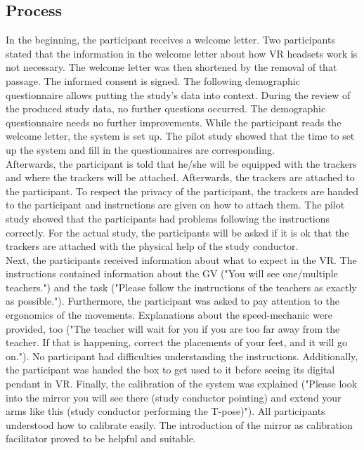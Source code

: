 \subsection{Process}
In the beginning, the participant receives a welcome letter. Two participants stated that the information in the welcome letter about how VR headsets work is not necessary. The welcome letter was then shortened by the removal of that passage. The informed consent is signed. The following demographic questionnaire allows putting the study's data into context. During the review of the produced study data, no further questions occurred. The demographic questionnaire needs no further improvements. While the participant reads the welcome letter, the system is set up. The pilot study showed that the time to set up the system and fill in the questionnaires are corresponding.\\
Afterwards, the participant is told that he/she will be equipped with the trackers and where the trackers will be attached. Afterwards, the trackers are attached to the participant. To respect the privacy of the participant, the trackers are handed to the participant and instructions are given on how to attach them. The pilot study showed that the participants had problems following the instructions correctly. For the actual study, the participants will be asked if it is ok that the trackers are attached with the physical help of the study conductor.\\
Next, the participants received information about what to expect in the VR. The instructions contained information about the GV ("You will see one/multiple teachers.") and the task ("Please follow the instructions of the teachers as exactly as possible."). Furthermore, the participant was asked to pay attention to the ergonomics of the movements. Explanations about the speed-mechanic were provided, too ("The teacher will wait for you if you are too far away from the teacher. If that is happening, correct the placements of your feet, and it will go on."). No participant had difficulties understanding the instructions. Additionally, the participant was handed the box to get used to it before seeing its digital pendant in VR. Finally, the calibration of the system was explained ("Please look into the mirror you will see there (study conductor pointing) and extend your arms like this (study conductor performing the T-pose)"). All participants understood how to calibrate easily. The introduction of the mirror as calibration facilitator proved to be helpful and suitable.\\
